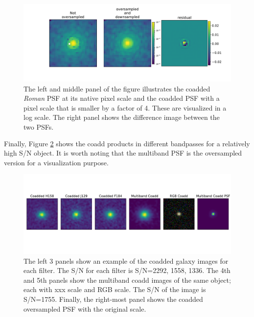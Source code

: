 \documentclass[fleqn,usenatbib]{mnras}
\begin{document}
\begin{figure}
	\includegraphics[width=\columnwidth]{figure3.pdf}
    \vspace*{-5mm}
    \caption{The left and middle panel of the figure illustrates the coadded \emph{Roman} PSF at its native pixel scale and the coadded PSF with a pixel scale that is smaller by a factor of 4. These are visualized in a log scale. The right panel shows the difference image between the two PSFs. }
    \label{fig:coadd_oversample_res}
\end{figure}

Finally, Figure \ref{fig:single_to_coadd_rgb} shows the coadd products in different bandpasses for a relatively high S/N object. It is worth noting that the multiband PSF is the oversampled version for a visualization purpose. 

\begin{figure}
	\includegraphics[width=\textwidth]{figure4_og.pdf}
    \vspace*{-20mm}
    \caption{The left 3 panels show an example of the coadded galaxy images for each filter. The S/N for each filter is S/N=2292, 1558, 1336. The 4th and 5th panels show the multiband coadd images of the same object; each with xxx scale and RGB scale. The S/N of the image is S/N=1755. Finally, the right-most panel shows the coadded oversampled PSF with the original scale.}
    \label{fig:single_to_coadd_rgb}
\end{figure}

\par
\end{document}
